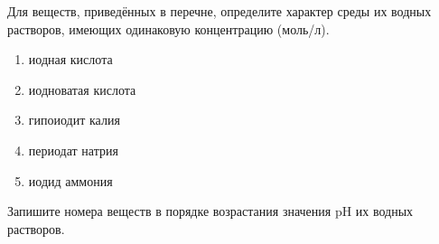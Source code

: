 Для веществ, приведённых в перечне, определите характер среды их водных растворов, имеющих одинаковую концентрацию (моль/л).\\
\begin{enumerate}
    \item иодная кислота
    \item иодноватая кислота
    \item гипоиодит калия
    \item периодат натрия
    \item иодид аммония
\end{enumerate}


Запишите номера веществ в порядке возрастания значения pH их водных растворов.\\

